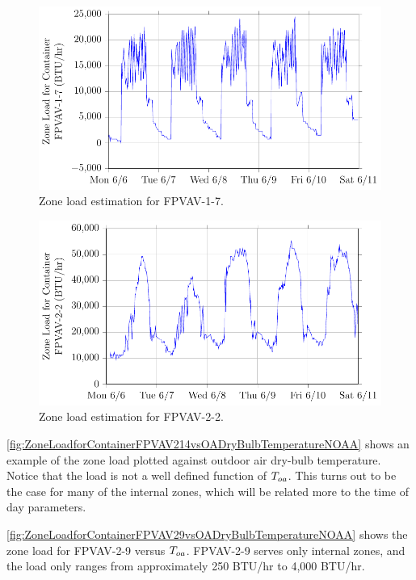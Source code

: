 \begin{figure}
\centering
\includegraphics[]{Plots/2016-06-22-1654-ZoneLoadforContainerFPVAV17-TikzData.pdf}
\caption{Zone load estimation for FPVAV-1-7.}
\label{fig:2016-06-22-1654-ZoneLoadforContainerFPVAV17-TikzData}
\end{figure}

\begin{figure}
\centering
\includegraphics[]{Plots/2016-06-22-1643-ZoneLoadforContainerFPVAV22-TikzData.pdf}
\caption{Zone load estimation for FPVAV-2-2.}
\label{fig:2016-06-22-1643-ZoneLoadforContainerFPVAV22-TikzData}
\end{figure}



\figref{} \ref{fig:ZoneLoadforContainerFPVAV214vsOADryBulbTemperatureNOAA} shows an example of the zone load plotted against outdoor air dry-bulb temperature. Notice that the load is not a well defined function of \(T_{oa}\). This turns out to be the case for many of the internal zones, which will be related more to the time of day parameters. 

\figref{} \ref{fig:ZoneLoadforContainerFPVAV29vsOADryBulbTemperatureNOAA} shows the zone load for FPVAV-2-9 versus \(T_{oa}\). FPVAV-2-9 serves only internal zones, and the load only ranges from approximately 250 BTU/hr to 4,000 BTU/hr.


